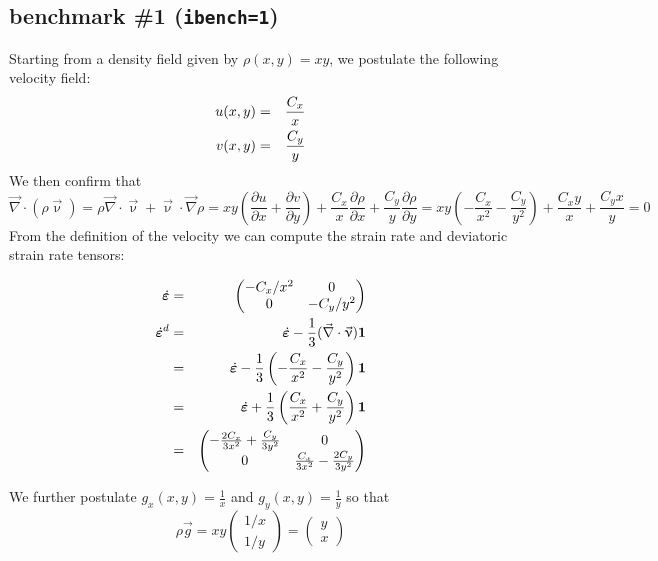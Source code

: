 \subsection*{benchmark \#1 ({\tt ibench=1})}

Starting from a density field given by
$\rho(x,y) = xy$, we postulate the following velocity field:
\begin{eqnarray}
u(x,y) &=& \frac{C_x}{x} \nonumber\\
v(x,y) &=& \frac{C_y}{y} \nonumber
\end{eqnarray}
We then confirm that 
\[
\vec\nabla \cdot (\rho \vec\upnu) 
= \rho \vec\nabla \cdot \vec\upnu
+ \vec\upnu \cdot \vec\nabla \rho
= xy \left(\frac{\partial u}{\partial x}+\frac{\partial v}{\partial y} \right)
+ \frac{C_x}{x} \frac{\partial \rho}{\partial x}
+ \frac{C_y}{y} \frac{\partial \rho}{\partial y}
= xy \left( -\frac{C_x}{x^2} - \frac{C_y}{y^2}  \right)
+ \frac{C_x y}{x} + \frac{C_y x}{y}=0
\]
From the definition of the velocity we can compute the strain rate and deviatoric strain rate tensors:

\begin{eqnarray}
\dot{\bm \varepsilon} 
&=& 
\begin{pmatrix}
-C_x/x^ 2 & 0 \\
0 & -C_y/y^2
\end{pmatrix} \nonumber\\
\dot{\bm \varepsilon}^d 
&=& \dot{\bm \varepsilon} -\frac13  (\vec\nabla \cdot \vec\upnu) {\bm 1} \nonumber\\
&=& \dot{\bm \varepsilon} -\frac13  \left( -\frac{C_x}{x^2} - \frac{C_y}{y^2} \right) {\bm 1} \nonumber\\
&=&\dot{\bm \varepsilon} +\frac13  \left( \frac{C_x}{x^2} + \frac{C_y}{y^2}  \right) {\bm 1} \nonumber\\
&=&
\begin{pmatrix}
-\frac{2C_x}{3x^2} + \frac{C_y}{3y^2} & 0 \\
0 & \frac{C_x}{3x^2} - \frac{2C_y}{3y^2}
\end{pmatrix} \nonumber
\end{eqnarray}

We further postulate $g_x(x,y) = \frac{1}{x}$ and $g_y(x,y) = \frac{1}{y}$ 
so that 
\[
\rho \vec{g} = xy 
\begin{pmatrix}
1/x \\ 1/y
\end{pmatrix}
=
\begin{pmatrix}
 y\\ x
\end{pmatrix}
\]

